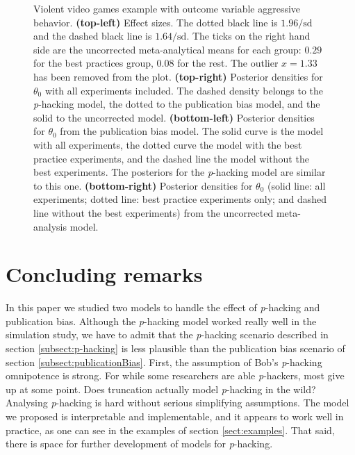 \documentclass{article}
\theoremstyle{plain}
\theoremstyle{definition}
\begin{document}
\begin{figure}
\caption{\label{fig:anderson2010}Violent video games example with outcome variable aggressive behavior. \textbf{(top-left)} Effect sizes. The dotted black line is $1.96/\textrm{sd}$ and the dashed black line is $1.64/\textrm{sd}$. The ticks on the right hand side are the uncorrected meta-analytical means for each group: $0.29$ for the best practices group, $0.08$ for the rest. The outlier $x=1.33$ has been removed from the plot.
\textbf{(top-right)} Posterior densities for $\theta_{0}$ with all experiments included. The dashed density belongs to the \textit{p}-hacking model, the dotted to the publication bias model, and the solid to the uncorrected model. \textbf{(bottom-left)} Posterior densities for $\theta_{0}$ from the publication bias model. The solid curve is the model with all experiments, the dotted curve the model with the best practice experiments, and the dashed line the model without the best experiments. The posteriors for the \textit{p}-hacking model are similar to this one. \textbf{(bottom-right)} Posterior densities for $\theta_{0}$ (solid line: all experiments; dotted line: best practice experiments only; and dashed line without the best experiments) from the uncorrected meta-analysis model.}
\end{figure}

\section{Concluding remarks}\label{sect:conclusions}

In this paper we studied two models to handle the effect of \textit{p}-hacking and publication bias. Although the \textit{p}-hacking model worked really well in the simulation study, we have to admit that the \textit{p}-hacking scenario described in section \ref{subsect:p-hacking} is less plausible than the publication bias scenario of section \ref{subsect:publicationBias}. First, the assumption of Bob's \textit{p}-hacking omnipotence is strong. For while some researchers are able \textit{p}-hackers, most give up at some point. Does truncation actually model \textit{p}-hacking in the wild? Analysing \textit{p}-hacking is hard without serious simplifying assumptions. The model we proposed is interpretable and implementable, and it appears to work well in practice, as one can see in the examples of section \ref{sect:examples}. That said, there is space for further development of models for \textit{p}-hacking.
\end{document}
